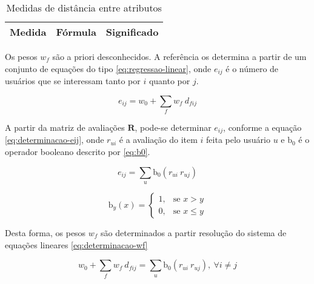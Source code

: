 \begin{table}[H]
\begin{center}
    \caption{Medidas de distância entre atributos}
    \label{tab:medidas-distancia}
    \begin{tabular}{ | l | c | p{5cm} | }
    \hline
    \textbf{Medida} & \textbf{Fórmula} & \textbf{Significado} \\ \hline
    \end{tabular}
\end{center}
\end{table}
 
Os pesos $w_f$ são a priori desconhecidos. A referência \cite{symeonidis2007feature} os determina a partir de um conjunto de equações do tipo \ref{eq:regressao-linear}, onde $e_{ij}$ é o número de usuários que se interessam tanto por $i$ quanto por $j$. 

\begin{equation}
\label{eq:regressao-linear} 
    e_{ij} = w_0 + \sum_{f}{w_{f} ~ d_{fij}}
\end{equation} 

A partir da matriz de avaliações $\mathbf{R}$, pode-se determinar $e_{ij}$, conforme a equação \ref{eq:determinacao-eij}, onde $r_{ui}$ é a avaliação do item $i$ feita pelo usuário $u$ e $\mathrm{b_0}$ é o operador booleano descrito por \ref{eq:b0}.

\begin{equation}
\label{eq:determinacao-eij} 
    e_{ij} = \sum_{u}{\mathrm{b_0}\left(r_{ui} ~ r_{uj}\right)}
\end{equation} 

\begin{equation}
\label{eq:b0}
\mathrm{b}_y\left(x\right) = 
\begin{cases}
1, &\text{se }x>y \\
0, &\text{se }x\leq y
\end{cases} 
\end{equation}

Desta forma, os pesos $w_f$ são determinados a partir resolução do sistema de equações lineares \ref{eq:determinacao-wf}

\begin{equation}
\label{eq:determinacao-wf} 
    w_0 + \sum_{f}{w_{f} ~ d_{fij}} = \sum_{u}{\mathrm{b_0}\left(r_{ui} ~ r_{uj}\right)},~\forall i \neq j 
\end{equation} 



